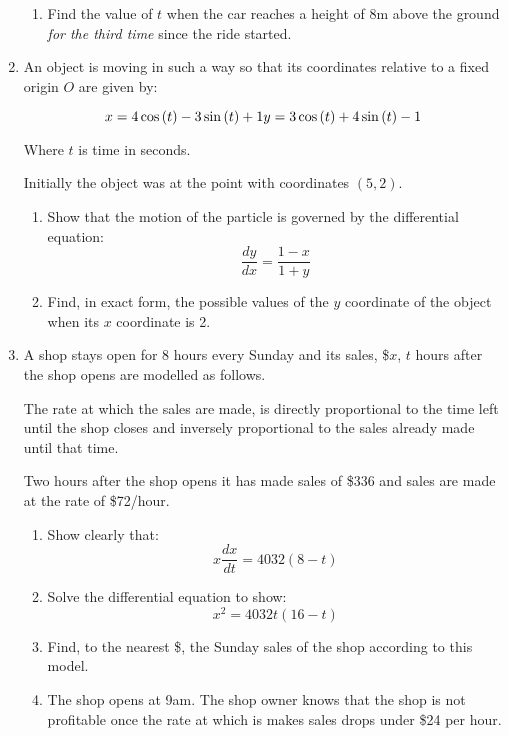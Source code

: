 \documentclass[../main.tex]{subfiles}
\begin{document}
\begin{enumerate}[itemsep=0.7cm]
\begin{enumerate}[itemsep=0.5cm]
        \item
        Find the value of $t$ when the car reaches a height of 8m above the ground \textit{for the third time} since the ride started.
    \end{enumerate}

    \item
    An object is moving in such a way so that its coordinates relative to a fixed origin $O$ are given by:

    \[x=4\cos{(t)}-3\sin{(t)}+1\\
    y=3\cos{(t)}+4\sin{(t)}-1\]

    Where $t$ is time in seconds.

    Initially the object was at the point with coordinates $(5,2)$.

    \begin{enumerate}[itemsep=0.5cm]
        \item
        Show that the motion of the particle is governed by the differential equation:
        \[\frac{dy}{dx}=\frac{1-x}{1+y}\]

        \item 
        Find, in exact form, the possible values of the $y$ coordinate of the object when its $x$ coordinate is 2.
    \end{enumerate}

    \item 
    A shop stays open for 8 hours every Sunday and its sales, \$$x$, $t$ hours after the shop opens are modelled as follows.

    The rate at which the sales are made, is directly proportional to the time left until the shop closes and inversely proportional to the sales already made until that time.

    Two hours after the shop opens it has made sales of \$336 and sales are made at the rate of \$72/hour.

    \begin{enumerate}[itemsep=0.5cm]
        \item 
        Show clearly that:
        \[x\frac{dx}{dt}=4032(8-t)\]

        \item 
        Solve the differential equation to show:
        \[x^2=4032t(16-t)\]

        \item 
        Find, to the nearest \$, the Sunday sales of the shop according to this model.

        \item
        The shop opens at 9am. The shop owner knows that the shop is not profitable once the rate at which is makes sales drops under \$24 per hour.


\end{enumerate}
\end{enumerate}
\end{document}
